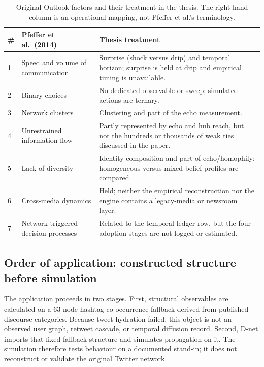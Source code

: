 \begin{table}[t]
\centering
\caption{Original Outlook factors and their treatment in the thesis.  The
right-hand column is an operational mapping, not Pfeffer et al.'s
terminology.}
\label{tab:pfeffer-original-remap}
\small
\begin{tabular}{p{}p{}p{}}
\toprule
\# & Pfeffer et al.\ (2014) & Thesis treatment \\
\midrule
1 & Speed and volume of communication
  & Surprise (shock versus drip) and temporal horizon; surprise is held at
    drip and empirical timing is unavailable. \\
2 & Binary choices
  & No dedicated observable or sweep; simulated actions are ternary. \\
3 & Network clusters
  & Clustering and part of the echo measurement. \\
4 & Unrestrained information flow
  & Partly represented by echo and hub reach, but not the hundreds or
    thousands of weak ties discussed in the paper. \\
5 & Lack of diversity
  & Identity composition and part of echo/homophily; homogeneous versus
    mixed belief profiles are compared. \\
6 & Cross-media dynamics
  & Held; neither the empirical reconstruction nor the engine contains a
    legacy-media or newsroom layer. \\
7 & Network-triggered decision processes
  & Related to the temporal ledger row, but the four adoption stages are not
    logged or estimated. \\
\bottomrule
\end{tabular}
\end{table}

\subsection{Order of application: constructed structure before simulation}

The application proceeds in two stages. First, structural observables are
calculated on a 63-node hashtag co-occurrence fallback derived from published
discourse categories. Because tweet hydration failed, this object is not an
observed user graph, retweet cascade, or temporal diffusion record. Second,
D-net imports that fixed fallback structure and simulates propagation on it.
The simulation therefore tests behaviour on a documented stand-in; it does
not reconstruct or validate the original Twitter network.

